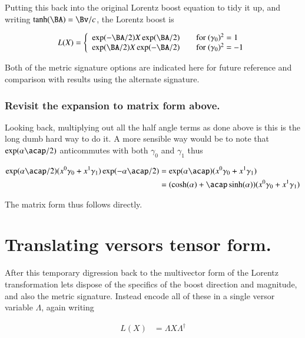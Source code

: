 Putting this back into the original Lorentz boost equation to tidy it up, and 
writing $\tanh(\BA) = \Bv/c$, the Lorentz boost is 

\begin{align*}
L(X) &= 
\left\{
\begin{array}{l l}
\exp(-\BA/2) X \exp(\BA/2) & \quad \mbox{for $(\gamma_0)^2 = 1$} \\
\exp(\BA/2) X \exp(-\BA/2) & \quad \mbox{for $(\gamma_0)^2 = -1$} \\
\end{array} \right. \\
\end{align*}

Both of the metric signature options are indicated here for future reference and comparison with results using the alternate signature.

\subsubsection{Revisit the expansion to matrix form above. }

Looking back, multiplying out all the half angle terms as done above is this is the long dumb hard way to do it.
A more sensible way would be to note that $\exp(\alpha\acap/2)$ anticommutes with both $\gamma_0$ and $\gamma_1$ thus

\begin{align*}
\exp( \alpha \acap/2 ) (x^0\gamma_0 + x^1\gamma_1) \exp( -\alpha \acap/2 )
&= \exp( \alpha \acap ) (x^0\gamma_0 + x^1\gamma_1) \\
&= (\cosh( \alpha ) + \acap \sinh(\alpha)) (x^0\gamma_0 + x^1\gamma_1) \\
\end{align*}

The matrix form thus follows directly.

\section{Translating versors tensor form. }

After this temporary digression back to the multivector form of the Lorentz transformation lets dispose of the specifics of the boost direction and magnitude, and also the metric
signature.  Instead encode all of these in a single versor variable $\Lambda$, again writing

\begin{align}
L(X) &= \Lambda X \Lambda^\dagger
\end{align}


